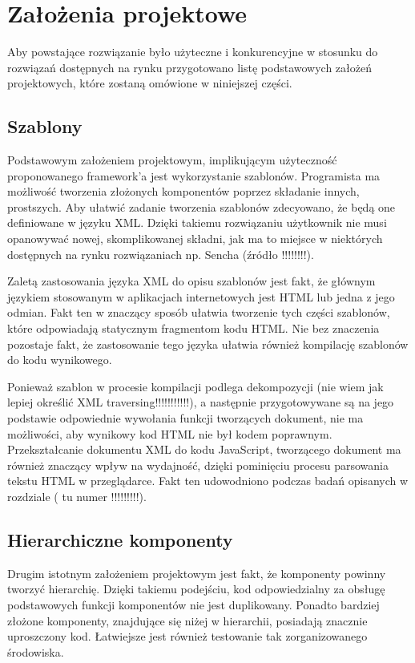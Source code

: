 \section{Założenia projektowe}

Aby powstające rozwiązanie było użyteczne i konkurencyjne w stosunku do rozwiązań
dostępnych na rynku przygotowano listę podstawowych założeń projektowych, które zostaną
omówione w niniejszej części.

\subsection{Szablony}

Podstawowym założeniem projektowym, implikującym użyteczność proponowanego framework'a
jest wykorzystanie szablonów. Programista ma możliwość tworzenia złożonych komponentów
poprzez składanie innych, prostszych. Aby ułatwić zadanie tworzenia szablonów zdecyowano,
że będą one definiowane w języku XML. Dzięki takiemu rozwiązaniu użytkownik nie musi
opanowywać nowej, skomplikowanej składni, jak ma to miejsce w niektórych dostępnych
na rynku rozwiązaniach np. Sencha (źródło !!!!!!!!).

Zaletą zastosowania języka XML do opisu szablonów jest fakt, że głównym językiem
stosowanym w aplikacjach internetowych jest HTML lub jedna z jego odmian. Fakt ten
w znaczący sposób ułatwia tworzenie tych części szablonów, które odpowiadają statycznym
fragmentom kodu HTML. Nie bez znaczenia pozostaje fakt, że zastosowanie tego języka
ułatwia również kompilację szablonów do kodu wynikowego.

Ponieważ szablon w procesie kompilacji podlega dekompozycji (nie wiem jak lepiej określić
XML traversing!!!!!!!!!!!), a następnie przygotowywane są na jego podstawie odpowiednie wywołania
funkcji tworzących dokument, nie ma możliwości, aby wynikowy kod HTML nie był kodem
poprawnym. Przekształcanie dokumentu XML do kodu JavaScript, tworzącego dokument
ma również znaczący wpływ na wydajność, dzięki pominięciu procesu parsowania tekstu
HTML w przeglądarce. Fakt ten udowodniono podczas badań opisanych w rozdziale ( tu numer !!!!!!!!!).

\subsection{Hierarchiczne komponenty}

Drugim istotnym założeniem projektowym jest fakt, że komponenty powinny tworzyć hierarchię.
Dzięki takiemu podejściu, kod odpowiedzialny za obsługę podstawowych funkcji komponentów
nie jest duplikowany. Ponadto bardziej złożone komponenty, znajdujące się niżej w hierarchii,
posiadają znacznie uproszczony kod. Łatwiejsze jest również testowanie tak zorganizowanego
środowiska.

